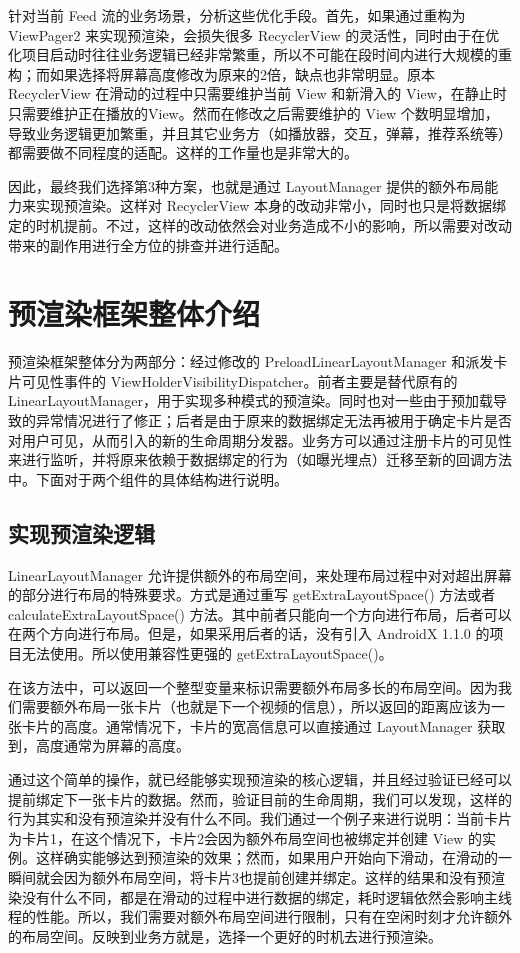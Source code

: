 针对当前 Feed 流的业务场景，分析这些优化手段。首先，如果通过重构为 ViewPager2 来实现预渲染，会损失很多 RecyclerView 的灵活性，同时由于在优化项目启动时往往业务逻辑已经非常繁重，所以不可能在段时间内进行大规模的重构；而如果选择将屏幕高度修改为原来的2倍，缺点也非常明显。原本 RecyclerView 在滑动的过程中只需要维护当前 View 和新滑入的 View，在静止时只需要维护正在播放的View。然而在修改之后需要维护的 View 个数明显增加，导致业务逻辑更加繁重，并且其它业务方（如播放器，交互，弹幕，推荐系统等）都需要做不同程度的适配。这样的工作量也是非常大的。

因此，最终我们选择第3种方案，也就是通过 LayoutManager 提供的额外布局能力来实现预渲染。这样对 RecyclerView 本身的改动非常小，同时也只是将数据绑定的时机提前。不过，这样的改动依然会对业务造成不小的影响，所以需要对改动带来的副作用进行全方位的排查并进行适配。

\section{预渲染框架整体介绍}

预渲染框架整体分为两部分：经过修改的 PreloadLinearLayoutManager 和派发卡片可见性事件的 ViewHolderVisibilityDispatcher。前者主要是替代原有的 LinearLayoutManager，用于实现多种模式的预渲染。同时也对一些由于预加载导致的异常情况进行了修正；后者是由于原来的数据绑定无法再被用于确定卡片是否对用户可见，从而引入的新的生命周期分发器。业务方可以通过注册卡片的可见性来进行监听，并将原来依赖于数据绑定的行为（如曝光埋点）迁移至新的回调方法中。下面对于两个组件的具体结构进行说明。

\subsection{实现预渲染逻辑}

LinearLayoutManager 允许提供额外的布局空间，来处理布局过程中对对超出屏幕的部分进行布局的特殊要求。方式是通过重写 getExtraLayoutSpace() 方法或者 calculateExtraLayoutSpace() 方法。其中前者只能向一个方向进行布局，后者可以在两个方向进行布局。但是，如果采用后者的话，没有引入 AndroidX 1.1.0 的项目无法使用。所以使用兼容性更强的 getExtraLayoutSpace()。

在该方法中，可以返回一个整型变量来标识需要额外布局多长的布局空间。因为我们需要额外布局一张卡片（也就是下一个视频的信息），所以返回的距离应该为一张卡片的高度。通常情况下，卡片的宽高信息可以直接通过 LayoutManager 获取到，高度通常为屏幕的高度。

通过这个简单的操作，就已经能够实现预渲染的核心逻辑，并且经过验证已经可以提前绑定下一张卡片的数据。然而，验证目前的生命周期，我们可以发现，这样的行为其实和没有预渲染并没有什么不同。我们通过一个例子来进行说明：当前卡片为卡片1，在这个情况下，卡片2会因为额外布局空间也被绑定并创建 View 的实例。这样确实能够达到预渲染的效果；然而，如果用户开始向下滑动，在滑动的一瞬间就会因为额外布局空间，将卡片3也提前创建并绑定。这样的结果和没有预渲染没有什么不同，都是在滑动的过程中进行数据的绑定，耗时逻辑依然会影响主线程的性能。所以，我们需要对额外布局空间进行限制，只有在空闲时刻才允许额外的布局空间。反映到业务方就是，选择一个更好的时机去进行预渲染。

